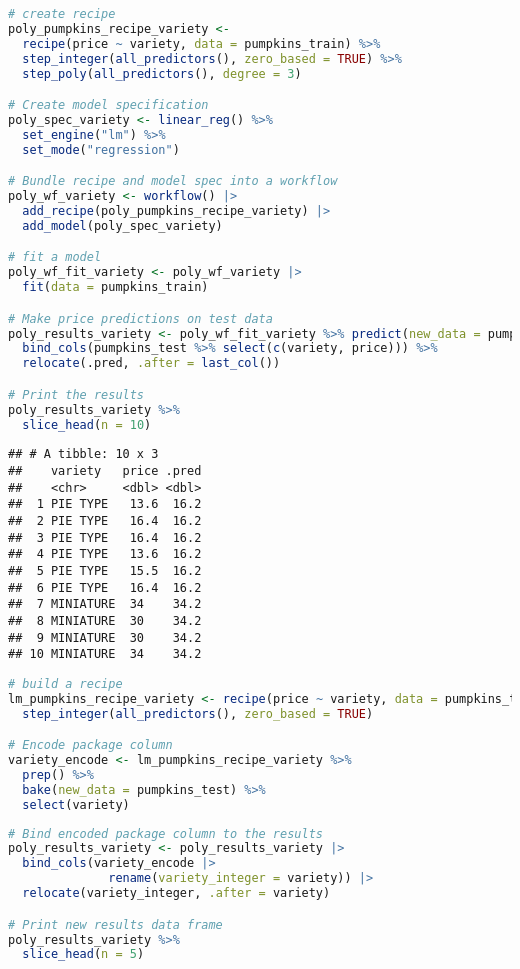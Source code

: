 \documentclass[
]{article}
\begin{document}
\begin{lstlisting}[language=R]
# create recipe
poly_pumpkins_recipe_variety <-
  recipe(price ~ variety, data = pumpkins_train) %>%
  step_integer(all_predictors(), zero_based = TRUE) %>% 
  step_poly(all_predictors(), degree = 3)

# Create model specification
poly_spec_variety <- linear_reg() %>% 
  set_engine("lm") %>% 
  set_mode("regression")

# Bundle recipe and model spec into a workflow
poly_wf_variety <- workflow() |> 
  add_recipe(poly_pumpkins_recipe_variety) |> 
  add_model(poly_spec_variety)

# fit a model
poly_wf_fit_variety <- poly_wf_variety |> 
  fit(data = pumpkins_train)

# Make price predictions on test data
poly_results_variety <- poly_wf_fit_variety %>% predict(new_data = pumpkins_test) %>% 
  bind_cols(pumpkins_test %>% select(c(variety, price))) %>% 
  relocate(.pred, .after = last_col())

# Print the results
poly_results_variety %>% 
  slice_head(n = 10)
\end{lstlisting}

\begin{lstlisting}
## # A tibble: 10 x 3
##    variety   price .pred
##    <chr>     <dbl> <dbl>
##  1 PIE TYPE   13.6  16.2
##  2 PIE TYPE   16.4  16.2
##  3 PIE TYPE   16.4  16.2
##  4 PIE TYPE   13.6  16.2
##  5 PIE TYPE   15.5  16.2
##  6 PIE TYPE   16.4  16.2
##  7 MINIATURE  34    34.2
##  8 MINIATURE  30    34.2
##  9 MINIATURE  30    34.2
## 10 MINIATURE  34    34.2
\end{lstlisting}

\begin{lstlisting}[language=R]
# build a recipe 
lm_pumpkins_recipe_variety <- recipe(price ~ variety, data = pumpkins_train) %>% 
  step_integer(all_predictors(), zero_based = TRUE)

# Encode package column
variety_encode <- lm_pumpkins_recipe_variety %>% 
  prep() %>% 
  bake(new_data = pumpkins_test) %>% 
  select(variety)
\end{lstlisting}

\begin{lstlisting}[language=R]
# Bind encoded package column to the results
poly_results_variety <- poly_results_variety |>  
  bind_cols(variety_encode |> 
              rename(variety_integer = variety)) |>  
  relocate(variety_integer, .after = variety)

# Print new results data frame
poly_results_variety %>% 
  slice_head(n = 5)
\end{lstlisting}
\end{document}
